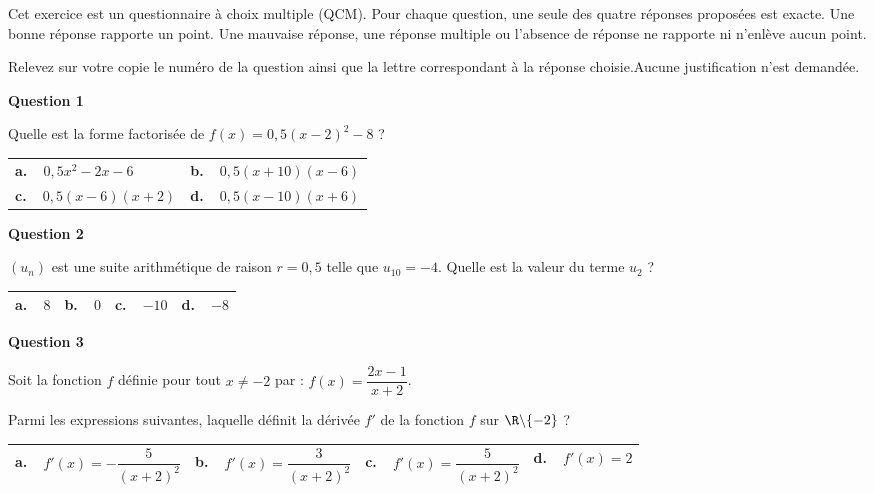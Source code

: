 \medskip

Cet exercice est un questionnaire à choix multiple (QCM). Pour chaque question, une seule des quatre réponses proposées est exacte. Une bonne réponse rapporte un point. Une mauvaise réponse, une réponse multiple ou l'absence de réponse ne rapporte ni n'enlève aucun point.

Relevez sur votre copie le numéro de la question ainsi que la lettre correspondant à la réponse choisie.Aucune justification n'est demandée.

\bigskip

\textbf{Question 1}

\medskip

Quelle est la forme factorisée de $f(x) = 0,5(x - 2)^2 - 8$ ?

\begin{center}
\begin{tabularx}{\linewidth}{|*{2}{X|}}\hline
\textbf{a.~~}$0,5x^2 - 2x - 6$&\textbf{b.~~}$0,5(x + 10)(x - 6)$\\
\textbf{c.~~}$0,5(x - 6)(x + 2)$&\textbf{d.~~}$0,5(x - 10)(x + 6)$\\ \hline
\end{tabularx}
\end{center}

\medskip

\textbf{Question 2}

\medskip

$\left(u_n\right)$ est une suite arithmétique de raison $r = 0,5$ telle que $u_{10} = -4$. Quelle est la valeur du terme $u_2$ ?

\begin{center}
\begin{tabularx}{\linewidth}{|*{4}{X|}}\hline
\textbf{a.~~}$8$&\textbf{b.~~}$0$&\textbf{c.~~}$- 10$&\textbf{d.~~}$- 8$\\ \hline
\end{tabularx}
\end{center}

\medskip

\textbf{Question 3}

\medskip

Soit la fonction $f$ définie pour tout $x \ne -2$ par : $f(x) = \dfrac{2x - 1}{x+2}$.

Parmi les expressions  suivantes, laquelle définit la dérivée $f'$ de la fonction $f$ sur 
$\R\backslash \{-2\}$ ?

\begin{center}
\begin{tabularx}{\linewidth}{|*{4}{X|}}\hline
\textbf{a.~~}$f'(x) = - \dfrac{5}{(x + 2)^2}$&\textbf{b.~~}$f'(x) =  \dfrac{3}{(x + 2)^2}$&\textbf{c.~~}$f'(x) = \dfrac{5}{(x + 2)^2}$&\textbf{d.~~}$f'(x) = 2$\rule[-3pt]{0mm}{7mm}\\ \hline
\end{tabularx}
\end{center}

